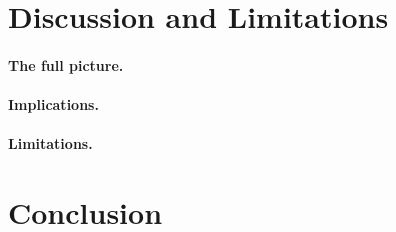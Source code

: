 \section{Discussion and Limitations}
\label{sec:discussion}

\paragraph{The full picture.}

\paragraph{Implications.}

\paragraph{Limitations.}


\section{Conclusion}
\label{sec:conclusion}

